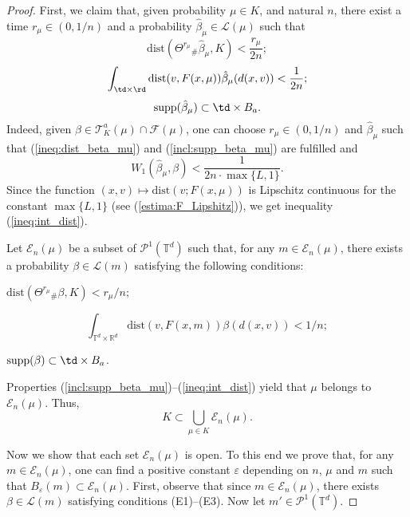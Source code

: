\documentclass[12pt]{article}
\newcommand{\ptd}{\mathcal{P}^1(\mathbb{T}^d)}
\newcommand{\inttrd}{\int_{\mathbb{T}^d\times \mathbb{R}^d}}
\begin{document}
\begin{proof}
	
	
	First,  we claim that, given probability $\mu\in K$, and natural $n$, there exist a time $r_\mu\in (0,1/n)$ and a probability $\hat{\beta}_\mu\in \mathcal{L}(\mu)$ such that 
	\begin{equation}\label{ineq:dist_beta_mu}
	\mathrm{dist}(\Theta^{r_\mu}{}_\#\hat{\beta}_\mu,K)<\frac{r_\mu}{2n};
	\end{equation}
	\begin{equation}\label{ineq:int_dist}
	\int_{\td\times \rd}\mathrm{dist}(v,F(x,\mu))\hat{\beta}_\mu(d(x,v))<\frac{1}{2n}; 
	\end{equation}
	\begin{equation}\label{incl:supp_beta_mu}
	\mathrm{supp}(\hat{\beta}_\mu)\subset \td\times B_a.
	\end{equation}	
	Indeed, given $\beta\in\mathcal{T}^a_K(\mu)\cap \mathcal{F}(\mu)$, one can choose $r_\mu\in (0,1/n)$ and $\hat{\beta}_\mu$ such that (\ref{ineq:dist_beta_mu}) and (\ref{incl:supp_beta_mu}) are fulfilled and 
	$$W_1(\hat{\beta}_\mu,\beta)<\frac{1}{2n\cdot\max\{L,1\}}.$$ 
	Since the function $(x,v)\mapsto \mathrm{dist}(v;F(x,\mu))$ is Lipschitz continuous for the constant $\max\{L,1\}$ (see (\ref{estima:F_Lipshitz})), we get inequality (\ref{ineq:int_dist}).
	
	Let $\mathcal{E}_n(\mu)$ be a subset of $\ptd$  such that, for any $m\in\mathcal{E}_n(\mu)$, there exists a probability 
	$\beta\in\mathcal{L}(m) $ satisfying the following conditions:
	\begin{list}{(E)}{}
		\item $\mathrm{dist}(\Theta^{r_\mu}{}_\#\beta,K)<r_\mu/n;$
		\item $$\inttrd\mathrm{dist}(v,F(x,m))\beta(d(x,v))<1/n; $$
		\item $\mathrm{supp}(\beta)\subset \td\times B_a$.
	\end{list}
	
	Properties (\ref{incl:supp_beta_mu})--(\ref{ineq:int_dist}) yield that $\mu$ belongs to $\mathcal{E}_n(\mu)$. Thus, 
	\begin{equation}\label{incl:covering_E}
	K\subset \bigcup_{\mu\in K}\mathcal{E}_n(\mu).
	\end{equation}
	
	Now we show that each set $\mathcal{E}_n(\mu)$ is open. To this end we prove that, for any $m\in \mathcal{E}_n(\mu)$, one can find a positive constant $\varepsilon$ depending on $n$, $\mu$ and $m$ such that $B_\varepsilon(m)\subset\mathcal{E}_n(\mu)$. First, observe that since $m\in \mathcal{E}_n(\mu)$, there exists $\beta\in\mathcal{L}(m)$ satisfying conditions (E1)--(E3). Now let $m'\in \ptd$.
	

\end{proof}
\end{document}

